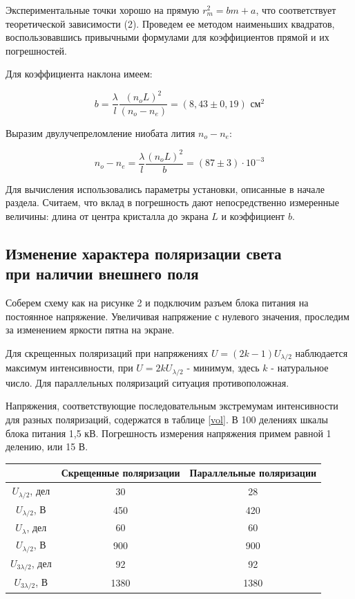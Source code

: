 	Экспериментальные точки хорошо на прямую $r_m^2 = bm + a$, что соответствует теоретической зависимости (2). Проведем ее методом наименьших квадратов, воспользовавшись привычными формулами для коэффициентов прямой и их погрешностей.
	
	Для коэффициента наклона имеем: 
	
	\[ b = \frac{\lambda}{l} \frac{(n_oL)^2}{(n_o - n_e)} = (8,43 \pm 0,19) \text{ см}^2 \] 
	
	Выразим двулучепреломление ниобата лития $n_o - n_e$:
	
	\[ n_o - n_e = \frac{\lambda}{l}\frac{(n_oL)^2}{b} = (87 \pm 3) \cdot 10^{-3} \]
	
	Для вычисления использовались параметры установки, описанные в начале раздела. Считаем, что вклад в погрешность дают непосредственно измеренные величины: длина от центра кристалла до экрана $L$ и коэффициент $b$.
	
	\subsection*{Изменение характера поляризации света \\ при наличии внешнего поля}
	
	
	
	Соберем схему как на рисунке 2 и подключим разъем блока питания на постоянное напряжение. Увеличивая напряжение с нулевого значения, проследим за изменением яркости пятна на экране. 
	
	Для скрещенных поляризаций при напряжениях $U = (2k - 1)U_{\lambda/2}$ наблюдается максимум интенсивности, при $U = 2kU_{\lambda/2}$ - минимум, здесь $k$ - натуральное число. Для параллельных поляризаций ситуация противоположная. 
	
	Напряжения, соответствующие последовательным экстремумам интенсивности для разных поляризаций, содержатся в таблице \ref{vol}.	В 100 делениях шкалы блока питания 1,5 кВ. Погрешность измерения напряжения примем равной 1 делению, или 15 В. 
	
\newpage
	
	\begin{center}
\begin{tabular}{|c|c|c|}
\hline
 &Скрещенные поляризации& Параллельные поляризации\\
\hline
$U_{\lambda/2}$, дел &30&28\\
\hline
$U_{\lambda/2}$, В&450&420\\
\hline
$U_{\lambda}$, дел&60&60\\
\hline
$U_{\lambda/2}$, В&900&900\\
\hline
$U_{3\lambda/2}$, дел&92&92\\
\hline
$U_{3\lambda/2}$, В&1380&1380\\
\hline
\end{tabular}
\end{center}

